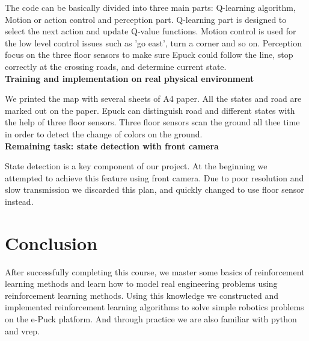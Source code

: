 \documentclass[a4paper, 11pt]{article} %
\begin{document}
The code can be basically divided
into three main parts: Q-learning algorithm, Motion or action control and
perception part. Q-learning part is designed to select the next action and update
Q-value functions. Motion control is used for the low level control issues such as
'go east', turn a corner and so on. Perception focus on the three floor sensors
to make sure Epuck could follow the line, stop correctly at the crossing roads,
and determine current state.
\\[3ex]
\textbf{Training and implementation on real physical environment}

We printed the map with several sheets of A4 paper. All the states and road are marked
out on the paper. Epuck can distinguish road and different states with the help
of three floor sensors. Three floor sensors scan the ground all thee time in order to
detect the change of colors on the ground.
\\[3ex]
\textbf{Remaining task: state detection with front camera}

State
detection is a key component of our project. At the beginning we attempted to
achieve this feature using front camera. Due to poor resolution and slow transmission
we discarded this plan, and quickly changed to use floor sensor instead.

\section{Conclusion}
After successfully completing this course, we master some basics of reinforcement
learning methods and learn how to model real engineering problems using reinforcement
learning methods. Using this knowledge we constructed and implemented reinforcement
learning algorithms to solve simple robotics problems on the e-Puck platform. And
through practice we are also familiar with python and vrep.
\end{document}
